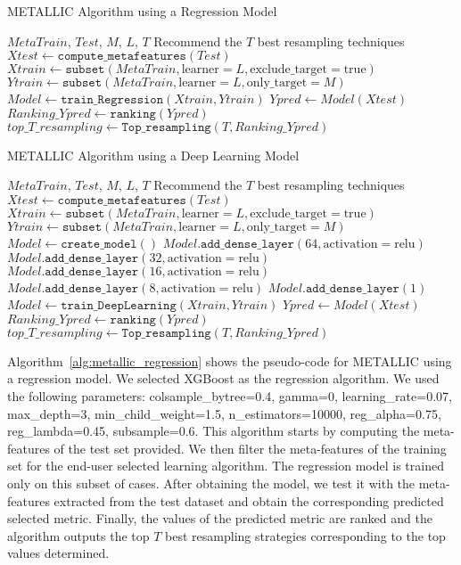 \documentclass{article}
\begin{document}
\begin{algorithm}
\caption{METALLIC Algorithm using a Regression Model}\label{alg:metallic_regression}
\begin{algorithmic}[1]
\Require$MetaTrain$, $Test$, $M$, $L$, $T$
\Ensure{} Recommend the $T$ best resampling techniques
\State$Xtest\gets\texttt{compute\_metafeatures}(Test)$
\State$Xtrain\gets\texttt{subset}(MetaTrain,\text{learner}=L,\text{exclude\_target}=\text{true})$
\State$Ytrain\gets\texttt{subset}(MetaTrain,\text{learner}=L,\text{only\_target}=M)$
\State$Model\gets\texttt{train\_Regression}(Xtrain,Ytrain)$
\State$Ypred\gets Model(Xtest)$
\State$Ranking\_Ypred\gets\texttt{ranking}(Ypred)$
\State$top\_T\_resampling\gets\texttt{Top\_resampling}(T,Ranking\_Ypred)$
\end{algorithmic}
\end{algorithm}


\begin{algorithm}
\caption{METALLIC Algorithm using a Deep Learning Model}\label{alg:metallic_deep}
\begin{algorithmic}[1]
\Require$MetaTrain$, $Test$, $M$, $L$, $T$
\Ensure Recommend the $T$ best resampling techniques
\State$Xtest\gets\texttt{compute\_metafeatures}(Test)$
\State$Xtrain\gets\texttt{subset}(MetaTrain,\text{learner}=L,\text{exclude\_target}=\text{true})$
\State$Ytrain\gets\texttt{subset}(MetaTrain,\text{learner}=L,\text{only\_target}=M)$
\State$Model\gets\texttt{create\_model}()$
\State$Model.\texttt{add\_dense\_layer}(64,\text{activation}=\text{relu})$
\State$Model.\texttt{add\_dense\_layer}(32,\text{activation}=\text{relu})$
\State$Model.\texttt{add\_dense\_layer}(16,\text{activation}=\text{relu})$
\State$Model.\texttt{add\_dense\_layer}(8,\text{activation}=\text{relu})$
\State$Model.\texttt{add\_dense\_layer}(1)$
\State$Model\gets\texttt{train\_DeepLearning}(Xtrain,Ytrain)$
\State$Ypred\gets Model(Xtest)$
\State$Ranking\_Ypred\gets\texttt{ranking}(Ypred)$
\State$top\_T\_resampling\gets\texttt{Top\_resampling}(T,Ranking\_Ypred)$
\end{algorithmic}
\end{algorithm}


Algorithm~\autoref{alg:metallic_regression} shows the pseudo-code for METALLIC using a regression model. We selected XGBoost as the regression algorithm. We used the following parameters: colsample\_bytree=0.4, gamma=0, learning\_rate=0.07, max\_depth=3, min\_child\_weight=1.5, n\_estimators=10000, reg\_alpha=0.75, reg\_lambda=0.45, subsample=0.6. This algorithm starts by computing the meta-features of the test set provided. We then filter the meta-features of the training set for the end-user selected learning algorithm. The regression model is trained only on this subset of cases. After obtaining the model, we test it with the meta-features extracted from the test dataset and obtain the corresponding predicted selected metric. Finally, the values of the predicted metric are ranked and the algorithm outputs the top $T$ best resampling strategies corresponding to the top values determined. 
\end{document}
